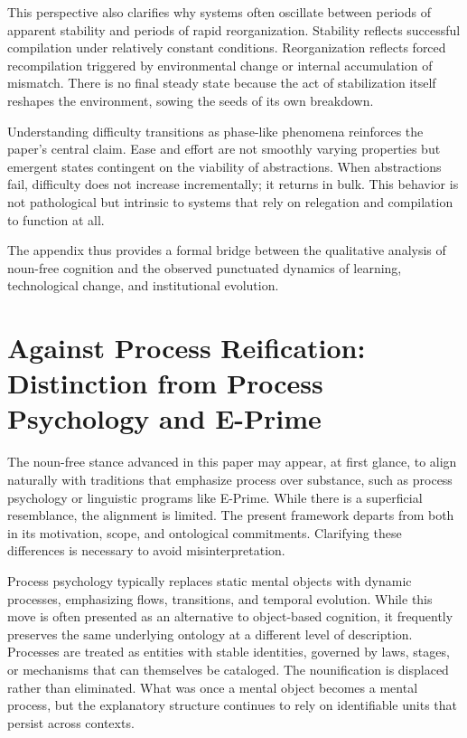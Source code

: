 \documentclass[12pt]{article}
\begin{document}
This perspective also clarifies why systems often oscillate between periods of apparent stability and periods of rapid reorganization. Stability reflects successful compilation under relatively constant conditions. Reorganization reflects forced recompilation triggered by environmental change or internal accumulation of mismatch. There is no final steady state because the act of stabilization itself reshapes the environment, sowing the seeds of its own breakdown.

Understanding difficulty transitions as phase-like phenomena reinforces the paper’s central claim. Ease and effort are not smoothly varying properties but emergent states contingent on the viability of abstractions. When abstractions fail, difficulty does not increase incrementally; it returns in bulk. This behavior is not pathological but intrinsic to systems that rely on relegation and compilation to function at all.

The appendix thus provides a formal bridge between the qualitative analysis of noun-free cognition and the observed punctuated dynamics of learning, technological change, and institutional evolution.

\section{Against Process Reification: Distinction from Process Psychology and E-Prime}

The noun-free stance advanced in this paper may appear, at first glance, to align naturally with traditions that emphasize process over substance, such as process psychology or linguistic programs like E-Prime. While there is a superficial resemblance, the alignment is limited. The present framework departs from both in its motivation, scope, and ontological commitments. Clarifying these differences is necessary to avoid misinterpretation.

Process psychology typically replaces static mental objects with dynamic processes, emphasizing flows, transitions, and temporal evolution. While this move is often presented as an alternative to object-based cognition, it frequently preserves the same underlying ontology at a different level of description. Processes are treated as entities with stable identities, governed by laws, stages, or mechanisms that can themselves be cataloged. The nounification is displaced rather than eliminated. What was once a mental object becomes a mental process, but the explanatory structure continues to rely on identifiable units that persist across contexts.
\end{document}
